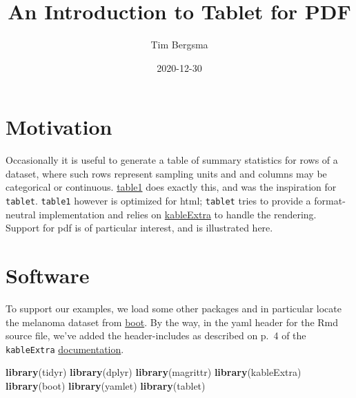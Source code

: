 \documentclass[]{article}
\title{An Introduction to Tablet for PDF}
\author{Tim Bergsma}
\date{2020-12-30}
\newenvironment{Shaded}{\begin{snugshade}}{\end{snugshade}}
\newcommand{\KeywordTok}[1]{\textcolor[rgb]{0.13,0.29,0.53}{\textbf{#1}}}
\newcommand{\NormalTok}[1]{#1}
\newcommand{\OperatorTok}[1]{\textcolor[rgb]{0.81,0.36,0.00}{\textbf{#1}}}
\newcommand{\StringTok}[1]{\textcolor[rgb]{0.31,0.60,0.02}{#1}}
\begin{document}
\maketitle

{
\hypersetup{linkcolor=black}
\setcounter{tocdepth}{2}
\tableofcontents
}
\hypertarget{motivation}{%
\section{Motivation}\label{motivation}}

Occasionally it is useful to generate a table of summary statistics for
rows of a dataset, where such rows represent sampling units and and
columns may be categorical or continuous.
\href{https://CRAN.R-project.org/package=table1}{table1} does exactly
this, and was the inspiration for \texttt{tablet}. \texttt{table1}
however is optimized for html; \texttt{tablet} tries to provide a
format-neutral implementation and relies on
\href{https://CRAN.R-project.org/package=kableExtra}{kableExtra} to
handle the rendering. Support for pdf is of particular interest, and is
illustrated here.

\hypertarget{software}{%
\section{Software}\label{software}}

To support our examples, we load some other packages and in particular
locate the melanoma dataset from
\href{https://CRAN.R-project.org/package=boot}{boot}. By the way, in the
yaml header for the Rmd source file, we've added the header-includes as
described on p.~4 of the \texttt{kableExtra}
\href{https://haozhu233.github.io/kableExtra/awesome_table_in_pdf.pdf}{documentation}.

\begin{Shaded}
\begin{Highlighting}[]
\KeywordTok{library}\NormalTok{(tidyr)}
\KeywordTok{library}\NormalTok{(dplyr)}
\KeywordTok{library}\NormalTok{(magrittr)}
\KeywordTok{library}\NormalTok{(kableExtra)}
\KeywordTok{library}\NormalTok{(boot)}
\KeywordTok{library}\NormalTok{(yamlet)}
\KeywordTok{library}\NormalTok{(tablet)}
\end{Highlighting}
\end{Shaded}

\begin{Shaded}
\end{Shaded}
\end{document}
